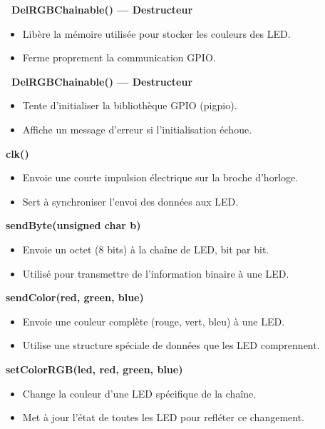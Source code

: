 \documentclass[main.tex]{subfiles}
\begin{document}
\textbf{~DelRGBChainable() — Destructeur}

\begin{itemize}
\item Libère la mémoire utilisée pour stocker les couleurs des LED.
\item Ferme proprement la communication GPIO.
\end{itemize}

\textbf{~DelRGBChainable() — Destructeur}

\begin{itemize}
\item Tente d’initialiser la bibliothèque GPIO (pigpio).
\item Affiche un message d’erreur si l’initialisation échoue.
\end{itemize}

\textbf{clk()}

\begin{itemize}
\item Envoie une courte impulsion électrique sur la broche d’horloge.
\item Sert à synchroniser l’envoi des données aux LED.
\end{itemize}

\textbf{sendByte(unsigned char b)}

\begin{itemize}
\item Envoie un octet (8 bits) à la chaîne de LED, bit par bit.
\item Utilisé pour transmettre de l'information binaire à une LED.
\end{itemize}

\textbf{sendColor(red, green, blue)}

\begin{itemize}
\item Envoie une couleur complète (rouge, vert, bleu) à une LED.
\item Utilise une structure spéciale de données que les LED comprennent.
\end{itemize}

\textbf{setColorRGB(led, red, green, blue)}

\begin{itemize}
\item Change la couleur d’une LED spécifique de la chaîne.
\item Met à jour l’état de toutes les LED pour refléter ce changement.
\end{itemize}
\end{document}
